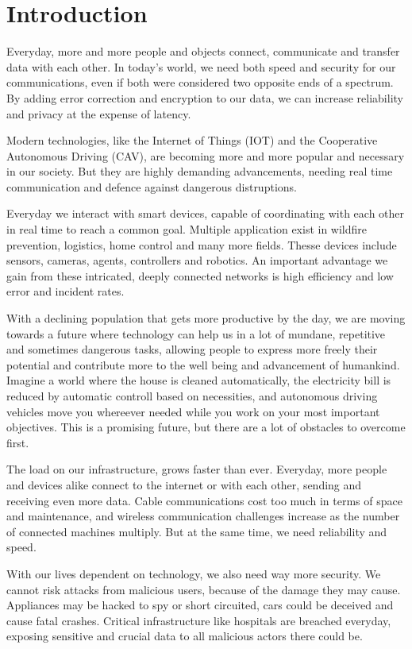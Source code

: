 \section{Introduction}

Everyday, more and more people and objects connect, communicate and transfer data with each other. In today's world, we need both speed and security for our communications, even if both were considered two opposite ends of a spectrum. By adding error correction and encryption to our data, we can increase reliability and privacy at the expense of latency.

Modern technologies, like the Internet of Things (IOT) and the Cooperative Autonomous Driving (CAV), are becoming more and more popular and necessary in our society. But they are highly demanding advancements, needing real time communication and defence against dangerous distruptions.

Everyday we interact with smart devices, capable of coordinating with each other in real time to reach a common goal. Multiple application exist in wildfire prevention, logistics, home control and many more fields. Thesse devices include sensors, cameras, agents, controllers and robotics. An important advantage we gain from these intricated, deeply connected networks is high efficiency and low error and incident rates.

With a declining population that gets more productive by the day, we are moving towards a future where technology can help us in a lot of mundane, repetitive and sometimes dangerous tasks, allowing people to express more freely their potential and contribute more to the well being and advancement of humankind. Imagine a world where the house is cleaned automatically, the electricity bill is reduced by automatic controll based on necessities, and autonomous driving vehicles move you whereever needed while you work on your most important objectives. This is a promising future, but there are a lot of obstacles to overcome first.

The load on our infrastructure, grows faster than ever. Everyday, more people and devices alike connect to the internet or with each other, sending and receiving even more data. Cable communications cost too much in terms of space and maintenance, and wireless communication challenges increase as the number of connected machines multiply. But at the same time, we need reliability and speed.

With our lives dependent on technology, we also need way more security. We cannot risk attacks from malicious users, because of the damage they may cause. Appliances may be hacked to spy or short circuited, cars could be deceived and cause fatal crashes. Critical infrastructure like hospitals are breached everyday, exposing sensitive and crucial data to all malicious actors there could be.


